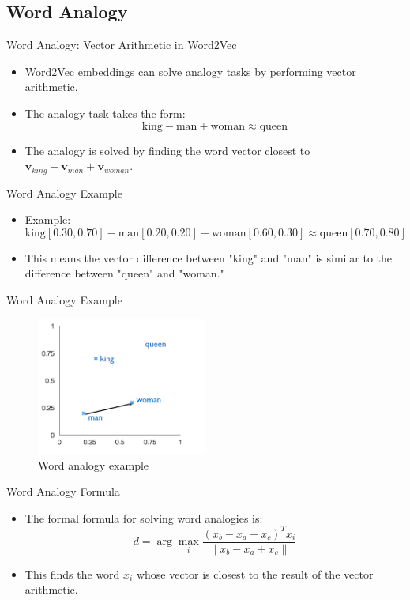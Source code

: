 \documentclass[serif, aspectratio=169]{beamer}
\begin{document}
\subsection{Word Analogy}

\begin{frame}{Word Analogy: Vector Arithmetic in Word2Vec}
    \begin{itemize}
        \item Word2Vec embeddings can solve analogy tasks by performing vector arithmetic.
        \item The analogy task takes the form:
        \[
        \text{king} - \text{man} + \text{woman} \approx \text{queen}
        \]
        \item The analogy is solved by finding the word vector closest to \( \mathbf{v}_{king} - \mathbf{v}_{man} + \mathbf{v}_{woman} \).
    \end{itemize}
\end{frame}

\begin{frame}{Word Analogy Example}
    \begin{itemize}
        \item Example:
        \[
        \text{king}[0.30, 0.70] - \text{man}[0.20, 0.20] + \text{woman}[0.60, 0.30] \approx \text{queen}[0.70, 0.80]
        \]
        \item This means the vector difference between "king" and "man" is similar to the difference between "queen" and "woman."
    \end{itemize}
\end{frame}


\begin{frame}{Word Analogy Example}
	\begin{figure}
		\centering
		\includegraphics[width=0.5\textwidth]{pic/4.png}
		\caption*{Word analogy example}
	\end{figure}
\end{frame}

\begin{frame}{Word Analogy Formula}
    \begin{itemize}
        \item The formal formula for solving word analogies is:
        \[
        d = \arg\max_i \frac{(x_b - x_a + x_c)^T x_i}{\|x_b - x_a + x_c\|}
        \]
        \item This finds the word \(x_i\) whose vector is closest to the result of the vector arithmetic.
    \end{itemize}
\end{frame}
\end{document}
